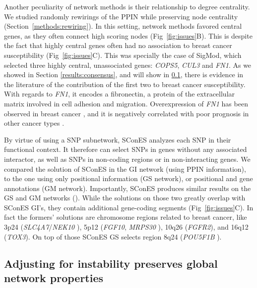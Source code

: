 \documentclass[10pt,letterpaper]{article}
\begin{document}
Another peculiarity of network methods is their relationship to degree centrality. We studied randomly rewirings of the PPIN while preserving node centrality (Section~\ref{methods:rewiring}). In this setting, network methods favored central genes, as they often connect high scoring nodes (Fig~\ref{fig:issues}B). This is despite the fact that highly central genes often had no association to breast cancer susceptibility (Fig~\ref{fig:issues}C). This was specially the case of SigMod, which selected three highly central, unassociated genes: \emph{COPS5}, \emph{CUL3} and \emph{FN1}. As we showed in Section \ref{results:consensus}, and will show in \ref{results:stable-consensus}, there is evidence in the literature of the contribution of the first two to breast cancer susceptibility. With regards to \emph{FN1}, it encodes a fibronectin, a protein of the extracellular matrix involved in cell adhesion and migration. Overexpression of \emph{FN1} has been observed in breast cancer \cite{Ioachim2002}, and it is negatively correlated with poor prognosis in other cancer types \cite{Yi2016,Sponziello2016}.

By virtue of using a SNP subnetwork, SConES analyzes each SNP in their functional context. It therefore can select SNPs in genes without any associated interactor, as well as SNPs in non-coding regions or in non-interacting genes. We compared the solution of SConES in the GI network (using PPIN information), to the one using only positional information (GS network), or positional and gene annotations (GM network). Importantly, SConES produces similar results on the GS and GM networks (). While the solutions on those two greatly overlap with SConES GI's, they contain additional gene-coding segments (Fig~\ref{fig:issues}C). In fact the formers' solutions are chromosome regions related to breast cancer, like 3p24 (\emph{SLC4A7}/\emph{NEK10} \cite{ahmed_newly_2009}), 5p12 (\emph{FGF10}, \emph{MRPS30} \cite{quigley_5p12_2014}), 10q26 (\emph{FGFR2}), and 16q12 (\emph{TOX3}). On top of those SConES GS selects region 8q24 (\emph{POU5F1B} \cite{breyer_expressed_2014}). 

 
\subsection{Adjusting for instability preserves global network properties}
\label{results:stable-consensus}
\end{document}
